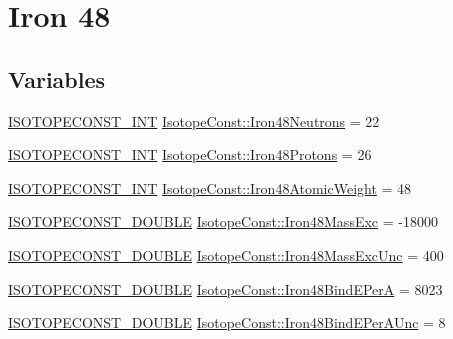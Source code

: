 \hypertarget{group___isotope_const-_iron-_fe48}{}\section{Iron 48}
\label{group___isotope_const-_iron-_fe48}
\subsection*{Variables}
\begin{DoxyCompactItemize}
\item 
\mbox{\hyperlink{group___isotope_const-_macros_ga5f18360b3e99483a35c32d789e62621c}{I\+S\+O\+T\+O\+P\+E\+C\+O\+N\+S\+T\+\_\+\+I\+NT}} \mbox{\hyperlink{group___isotope_const-_iron-_fe48_ga51e6b032d83b2d53ef4a08222dc8433f}{Isotope\+Const\+::\+Iron48\+Neutrons}} = 22
\item 
\mbox{\hyperlink{group___isotope_const-_macros_ga5f18360b3e99483a35c32d789e62621c}{I\+S\+O\+T\+O\+P\+E\+C\+O\+N\+S\+T\+\_\+\+I\+NT}} \mbox{\hyperlink{group___isotope_const-_iron-_fe48_gacc67ef63a0b77434f2b5e8c942444899}{Isotope\+Const\+::\+Iron48\+Protons}} = 26
\item 
\mbox{\hyperlink{group___isotope_const-_macros_ga5f18360b3e99483a35c32d789e62621c}{I\+S\+O\+T\+O\+P\+E\+C\+O\+N\+S\+T\+\_\+\+I\+NT}} \mbox{\hyperlink{group___isotope_const-_iron-_fe48_gaede3c9a1f1ce27f55d8a5ef3d7c668a3}{Isotope\+Const\+::\+Iron48\+Atomic\+Weight}} = 48
\item 
\mbox{\hyperlink{group___isotope_const-_macros_ga8f45a7272ce02c0b4c65c44636ed719a}{I\+S\+O\+T\+O\+P\+E\+C\+O\+N\+S\+T\+\_\+\+D\+O\+U\+B\+LE}} \mbox{\hyperlink{group___isotope_const-_iron-_fe48_ga673973be909b2f1ad27c0e3b98543728}{Isotope\+Const\+::\+Iron48\+Mass\+Exc}} = -\/18000
\item 
\mbox{\hyperlink{group___isotope_const-_macros_ga8f45a7272ce02c0b4c65c44636ed719a}{I\+S\+O\+T\+O\+P\+E\+C\+O\+N\+S\+T\+\_\+\+D\+O\+U\+B\+LE}} \mbox{\hyperlink{group___isotope_const-_iron-_fe48_gaa3d845f230318fad5f67686d7c24c8c3}{Isotope\+Const\+::\+Iron48\+Mass\+Exc\+Unc}} = 400
\item 
\mbox{\hyperlink{group___isotope_const-_macros_ga8f45a7272ce02c0b4c65c44636ed719a}{I\+S\+O\+T\+O\+P\+E\+C\+O\+N\+S\+T\+\_\+\+D\+O\+U\+B\+LE}} \mbox{\hyperlink{group___isotope_const-_iron-_fe48_ga3376e3d9886b68160928778772ec2214}{Isotope\+Const\+::\+Iron48\+Bind\+E\+PerA}} = 8023
\item 
\mbox{\hyperlink{group___isotope_const-_macros_ga8f45a7272ce02c0b4c65c44636ed719a}{I\+S\+O\+T\+O\+P\+E\+C\+O\+N\+S\+T\+\_\+\+D\+O\+U\+B\+LE}} \mbox{\hyperlink{group___isotope_const-_iron-_fe48_gaba8cf6dc28c55a84049eee31482a8a44}{Isotope\+Const\+::\+Iron48\+Bind\+E\+Per\+A\+Unc}} = 8

\end{DoxyCompactItemize}
